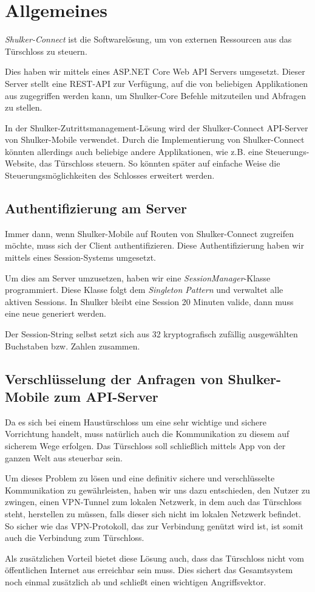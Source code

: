 \lstset{language=[Sharp]C}
\chapter{Allgemeines}
\textit{Shulker-Connect} ist die Softwarelösung, um von externen Ressourcen aus das Türschloss zu steuern.

Dies haben wir mittels eines ASP.NET Core Web API Servers umgesetzt. Dieser Server stellt eine REST-API zur Verfügung, 
auf die von beliebigen Applikationen aus zugegriffen werden kann, um Shulker-Core Befehle mitzuteilen und Abfragen zu stellen.

In der Shulker-Zutrittsmanagement-Lösung wird der Shulker-Connect API-Server von Shulker-Mobile verwendet. 
Durch die Implementierung von Shulker-Connect könnten allerdings auch beliebige andere Applikationen, 
wie z.B. eine Steuerungs-Website, das Türschloss steuern. 
So könnten später auf einfache Weise die Steuerungsmöglichkeiten des Schlosses erweitert werden.

\section{Authentifizierung am Server}
Immer dann, wenn Shulker-Mobile auf Routen von Shulker-Connect zugreifen möchte, muss sich der Client authentifizieren.
Diese Authentifizierung haben wir mittels eines Session-Systems umgesetzt.

Um dies am Server umzusetzen, haben wir eine \textit{SessionManager}-Klasse programmiert. Diese Klasse folgt dem
\textit{Singleton Pattern} und verwaltet alle aktiven Sessions. In Shulker bleibt eine Session 20 Minuten valide, dann
muss eine neue generiert werden.

Der Session-String selbst setzt sich aus 32 kryptografisch zufällig ausgewählten Buchstaben bzw. Zahlen zusammen.

\section{Verschlüsselung der Anfragen von Shulker-Mobile zum API-Server}
Da es sich bei einem Haustürschloss um eine sehr wichtige und sichere Vorrichtung handelt, muss natürlich auch die
Kommunikation zu diesem auf sicherem Wege erfolgen. Das Türschloss soll schließlich mittels App von der ganzen Welt
aus steuerbar sein.

Um dieses Problem zu lösen und eine definitiv sichere und verschlüsselte Kommunikation zu gewährleisten, haben wir uns dazu 
entschieden, den Nutzer zu zwingen, einen VPN-Tunnel zum lokalen Netzwerk, in dem auch das Türschloss steht, herstellen
zu müssen, falls dieser sich nicht im lokalen Netzwerk befindet. So sicher wie das VPN-Protokoll, das zur Verbindung genützt
wird ist, ist somit auch die Verbindung zum Türschloss.

Als zusätzlichen Vorteil bietet diese Lösung auch, dass das Türschloss nicht vom öffentlichen Internet aus erreichbar sein muss.
Dies sichert das Gesamtsystem noch einmal zusätzlich ab und schließt einen wichtigen Angriffsvektor.